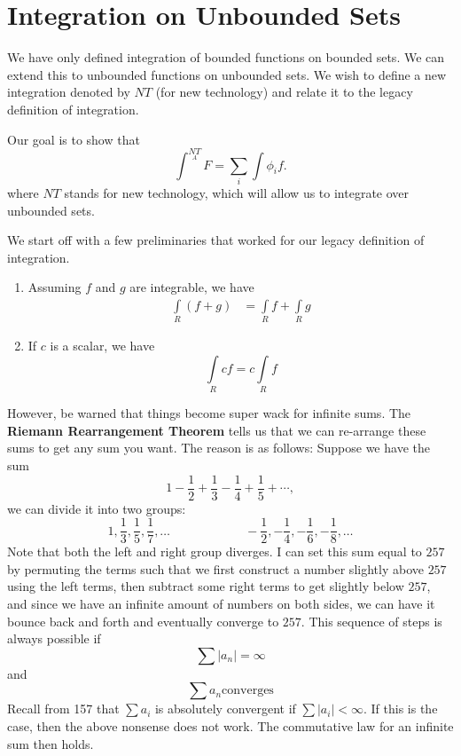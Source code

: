 \documentclass{article}
\numberwithin{equation}{section}
\begin{document}
\section{Integration on Unbounded Sets}
We have only defined integration of bounded functions on bounded sets. We can extend this to unbounded functions on unbounded sets. We wish to define a new integration denoted by $NT$ (for new technology) and relate it to the legacy definition of integration.

Our goal is to show that 
\begin{equation}
    \int^{NT}\limits_A F = \sum_{i} \int \phi_i f.
\end{equation}
where $NT$ stands for new technology, which will allow us to integrate over unbounded sets.

We start off with a few preliminaries that worked for our legacy definition of integration.
\begin{enumerate}
    \item Assuming $f$ and $g$ are integrable, we have 
    \begin{align}
        \int\limits_{R} (f+g) &= \int\limits_{R} f + \int\limits_{R} g 
    \end{align}
    \item If $c$ is a scalar, we have
    \begin{equation}
        \int\limits_{R} cf = c\int\limits_{R} f
    \end{equation}
\end{enumerate}
\begin{warning}
    However, be warned that things become super wack for infinite sums. The \textbf{Riemann Rearrangement Theorem} tells us that we can re-arrange these sums to get any sum you want. The reason is as follows: Suppose we have the sum 
\begin{equation}
    1-\frac{1}{2}+\frac{1}{3}-\frac{1}{4}+\frac{1}{5}+\cdots,
\end{equation}
we can divide it into two groups:
\begin{equation}
    1,\frac{1}{3},\frac{1}{5},\frac{1}{7}, \dots \quad\quad\quad\quad\quad\quad -\frac{1}{2}, -\frac{1}{4}, -\frac{1}{6}, -\frac{1}{8},\dots
\end{equation}
Note that both the left and right group diverges. I can set this sum equal to $257$ by permuting the terms such that we first construct a number slightly above $257$ using the left terms, then subtract some right terms to get slightly below $257$, and since we have an infinite amount of numbers on both sides, we can have it bounce back and forth and eventually converge to $257$. This sequence of steps is always possible if 
\begin{equation}
    \sum |a_n| = \infty
\end{equation}
and 
\begin{equation}
    \sum a_n \text{converges}
\end{equation}
Recall from 157 that $\sum a_i$ is absolutely convergent if $\sum |a_i| <\infty.$ If this is the case, then the above nonsense does not work. The commutative law for an infinite sum then holds.
\end{warning}
\end{document}
